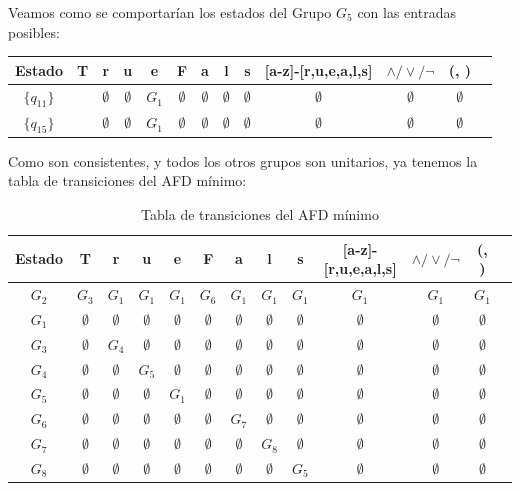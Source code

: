 Veamos como se comportarían los estados del Grupo $G_5$ con las entradas posibles:

\begin{table}[h!]
\centering
\begin{tabular}{|c|c|c|c|c|c|c|c|c|c|c|c|c|}
\hline
Estado &T & r & u & e & F & a & l &s &[a-z]-[r,u,e,a,l,s] &$\land/\lor/\lnot$ & (, )\\ \hline
\hline
$\{q_{11}\}$ & &  $\emptyset$& $\emptyset$ &  $G_1$& $\emptyset$  & $\emptyset$ & $\emptyset$ & $\emptyset$ & $\emptyset$ & $\emptyset$ & $\emptyset$\\ \hline
$\{q_{15}\}$ & &  $\emptyset$& $\emptyset$ & $G_1$ & $\emptyset$  & $\emptyset$ & $\emptyset$ & $\emptyset$ & $\emptyset$ & $\emptyset$ & $\emptyset$\\ \hline
\end{tabular}
\end{table}

Como son consistentes, y todos los otros grupos son unitarios, ya tenemos la tabla de transiciones del AFD mínimo:

\begin{table}[h!]
\centering
\begin{tabular}{|c|c|c|c|c|c|c|c|c|c|c|c|c|}
\hline
Estado &T & r & u & e & F & a & l &s &[a-z]-[r,u,e,a,l,s] &$\land/\lor/\lnot$ & (, )\\ \hline
\hline
$G_2$ & $ G_3$ & $ G_1$ & $G_1$ & $G_1$ & $G_6$ & $G_1$ & $G_1$ & $G_1$ & $G_1$ & $G_1$ & $G_1$\\ \hline
$G_1$ & $\emptyset$ & $\emptyset$ & $\emptyset$ & $\emptyset$ & $\emptyset$ & $\emptyset$ & $\emptyset$ & $\emptyset $ & $\emptyset$ & $\emptyset$ & $\emptyset$\\ \hline
$G_3$ & $\emptyset$ & $G_4$ & $\emptyset$ & $\emptyset$ & $\emptyset$  & $\emptyset$ & $\emptyset$ & $\emptyset$ & $\emptyset$ & $\emptyset$ & $\emptyset$\\ \hline
$G_4$ & $\emptyset$ &  $\emptyset$&  $G_5$& $\emptyset$ & $\emptyset$  & $\emptyset$ & $\emptyset$ & $\emptyset$ & $\emptyset$ & $\emptyset$ & $\emptyset$\\ \hline
$G_5$ & $\emptyset$ &  $\emptyset$& $\emptyset$ &  $G_1$& $\emptyset$  & $\emptyset$ & $\emptyset$ & $\emptyset$ & $\emptyset$ & $\emptyset$ & $\emptyset$\\ \hline
$G_6$ & $\emptyset$ & $\emptyset$ & $\emptyset$ & $\emptyset$  & $\emptyset$  & $G_7$ & $\emptyset$ & $\emptyset$& $\emptyset$ & $\emptyset$ & $\emptyset$\\ \hline
$G_7$ & $\emptyset$ &  $\emptyset$& $\emptyset$ & $\emptyset$ & $\emptyset$  & $\emptyset$ & $G_8$ & $\emptyset$ & $\emptyset$ & $\emptyset$ & $\emptyset$\\ \hline
$G_8$ & $\emptyset$ &  $\emptyset$& $\emptyset$ & $\emptyset$ & $\emptyset$  & $\emptyset$ & $\emptyset$ & $G_5$ & $\emptyset$ & $\emptyset$ & $\emptyset$\\ \hline
\end{tabular}
\caption{Tabla de transiciones del AFD mínimo}
\end{table}


